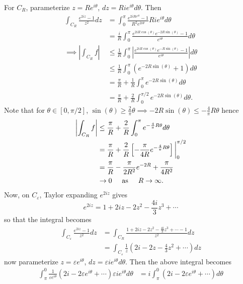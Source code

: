 \documentclass{article}
\begin{document}
\begin{itemize}
    For $C_R$, parameterize $z = Re^{i\theta}$, $dz = Rie^{i\theta}d\theta$. Then 
    \begin{align*}
        \int_{C_R}\frac{e^{2iz} - 1}{z^2}dz &= \int_0^{\pi}\frac{e^{2iRe^{i\theta}} - 1}{R^2e^{2i\theta}}Rie^{i\theta}d\theta\\
        &=\frac{i}{R}\int_0^{\pi}\frac{e^{2iR\cos(\theta)}e^{-2R\sin(\theta)}-1}{e^{i\theta}}d\theta\\
        \implies \left|\int_{C_R}f\right| &\leq \frac{1}{R}\int_0^{\pi}\left|\frac{e^{2iR\cos(\theta)}e^{-R\sin(\theta)} - 1}{e^{i\theta}}\right|d\theta\\
        &\leq \frac{1}{R}\int_0^{\pi}\left(e^{-2R\sin(\theta)} + 1\right)d\theta\\
        &= \frac{\pi}{R} + \frac{1}{R}\int_0^{\pi}e^{-2R\sin(\theta)}d\theta\\
        &= \frac{\pi}{R} + \frac{2}{R}\int_0^{\pi/2}e^{-2R\sin(\theta)}d\theta.
    \end{align*}
    Note that for $\theta \in [0,\pi/2]$, $\sin(\theta) \geq \frac{2}{\pi}\theta \implies -2R\sin(\theta) \leq -\frac{4}{\pi}R\theta$ hence
    \begin{align*}
        \left|\int_{C_R}f\right| &\leq \frac{\pi}{R} + \frac{2}{R}\int_0^{\pi}e^{-\frac{4}{\pi}R\theta}d\theta\\
        &= \frac{\pi}{R} + \frac{2}{R}\left[-\frac{\pi}{4R}e^{-\frac{4}{\pi}R\theta}\right]\bigg|_0^{\pi/2}\\
        &= \frac{\pi}{R} - \frac{\pi}{2R^2}e^{-2R} + \frac{\pi}{4R^2}\\
        &\to 0 \hspace{0.5cm} \text{as} \hspace{0.5cm} R \to \infty.
    \end{align*}
    Now, on $C_{\varepsilon}$, Taylor expanding $e^{2iz}$ gives 
    \[e^{2iz} = 1 + 2iz - 2z^2 - \frac{4i}{3}z^3 + \cdots\]
    so that the integral becomes
    \begin{align*}
        \int_{C_{\varepsilon}}\frac{e^{2iz} - 1}{z^2}dz &= \int_{C_R}\frac{1 + 2iz - 2z^2 - \tfrac{4i}{3}z^3 + \cdots - 1}{z^2} dz \\
        &= \int_{C_{\varepsilon}}\frac{1}{z}\left(2i - 2z - \frac{4}{3}z^2 + \cdots\right)dz
    \end{align*}
    now parameterize $z = \varepsilon e^{i\theta}$, $dz = \varepsilon ie^{i\theta}d\theta$. Then the above integral becomes
    \begin{align*}
        \int_{\pi}^0 \frac{1}{\varepsilon e^{i\theta}}\left(2i - 2\varepsilon e^{i \theta} + \cdots\right)\varepsilon i e^{i\theta}d\theta &= i\int_{\pi}^0\left(2i - 2\varepsilon e^{i\theta} + \cdots\right)d\theta\\

\end{align*}
\end{itemize}
\end{document}
